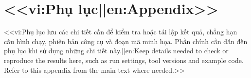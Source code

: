 \chapter{<<vi:Phụ lục||en:Appendix>>}
<<vi:Phụ lục lưu các chi tiết cần để kiểm tra hoặc tái lập kết quả, chẳng hạn cấu hình chạy, phiên bản công cụ và đoạn mã minh họa. Phần chính cần dẫn đến phụ lục khi sử dụng những chi tiết này.||en:Keep details needed to check or reproduce the results here, such as run settings, tool versions and example code. Refer to this appendix from the main text where needed.>>
